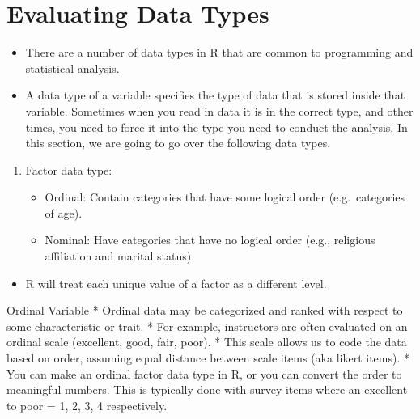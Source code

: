 \documentclass[
  letterpaper,
  DIV=11,
  numbers=noendperiod]{scrreprt}
\providecommand{\tightlist}{%
  \setlength{\itemsep}{0pt}\setlength{\parskip}{0pt}}\usepackage{longtable,booktabs,array}
\begin{document}

\chapter{Evaluating Data Types}\label{evaluating-data-types}

\begin{itemize}
\tightlist
\item
  There are a number of data types in R that are common to programming
  and statistical analysis.
\item
  A data type of a variable specifies the type of data that is stored
  inside that variable. Sometimes when you read in data it is in the
  correct type, and other times, you need to force it into the type you
  need to conduct the analysis. In this section, we are going to go over
  the following data types.\\
\end{itemize}

\begin{enumerate}
\def\labelenumi{\arabic{enumi}.}
\tightlist
\item
  Factor data type:

  \begin{itemize}
  \tightlist
  \item
    Ordinal: Contain categories that have some logical order
    (e.g.~categories of age).
  \item
    Nominal: Have categories that have no logical order (e.g., religious
    affiliation and marital status).
  \end{itemize}
\end{enumerate}

\begin{itemize}
\tightlist
\item
  R will treat each unique value of a factor as a different level.
\end{itemize}

Ordinal Variable * Ordinal data may be categorized and ranked with
respect to some characteristic or trait. * For example, instructors are
often evaluated on an ordinal scale (excellent, good, fair, poor). *
This scale allows us to code the data based on order, assuming equal
distance between scale items (aka likert items). * You can make an
ordinal factor data type in R, or you can convert the order to
meaningful numbers. This is typically done with survey items where an
excellent to poor = 1, 2, 3, 4 respectively.
\end{document}
